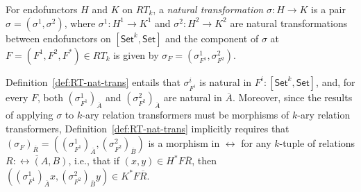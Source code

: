 \documentclass{lmcs}
\theoremstyle{plain}\newtheorem{satz}[thm]{Satz}
\newcommand{\set}{\mathsf{Set}}
\begin{document}
\begin{defi}\label{def:RT-nat-trans}
For endofunctors $H$ and $K$ on $RT_k$, a {\em natural transformation}
$\sigma : H \to K$ is a pair $\sigma = (\sigma^1, \sigma^2)$, where
$\sigma^1 : H^1 \to K^1$ and $\sigma^2 : H^2 \to K^2$ are natural
transformations between endofunctors on $[\set^k,\set]$ and the
component of $\sigma$ at $F = (F^1,F^2,F^*) \in RT_k$ is given by
$\sigma_F = (\sigma^1_{F^1}, \sigma^2_{F^2})$.
\end{defi}
Definition~\ref{def:RT-nat-trans} entails that $\sigma^i_{F^i}$ is
natural in $F^i : [\set^k,\set]$, and, for every $F$, both
$(\sigma^1_{F^1})_{\overline{A}}$ and
$(\sigma^2_{F^2})_{\overline{A}}$ are natural in $\overline{A}$.
Moreover, since the results of applying $\sigma$ to $k$-ary relation
transformers must be morphisms of $k$-ary relation transformers,
Definition~\ref{def:RT-nat-trans} implicitly requires that
$(\sigma_F)_{\overline{R}} = ( (\sigma^1_{F^1})_{\overline{A}},
(\sigma^2_{F^2})_{\overline{B}})$ is a morphism in $\rel$ for any
$k$-tuple of relations $\overline{R : \rel(A, B)}$, i.e., that if $(x,
y) \in H^*F\overline{R}$, then $((\sigma^1_{F^1})_{\overline{A}} x,
(\sigma^2_{F^2})_{\overline{B}} y) \in K^*F\overline{R}$.
\end{document}
